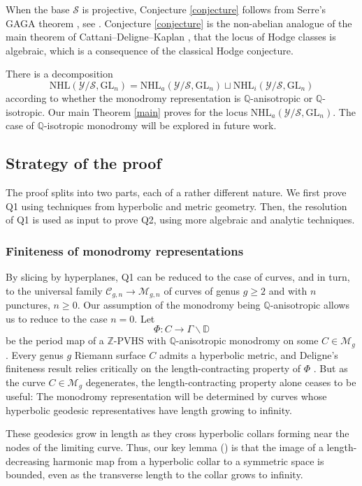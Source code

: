 \documentclass[10pt,letterpaper,english,reqno]{amsart}
\numberwithin{equation}{subsection}
\newcommand\cC{{\mathcal C}}
\newcommand\cM{{\mathcal M}}
\newcommand\cS{{\mathcal S}}
\newcommand\cY{{\mathcal Y}}
\newcommand\bD{{\mathbb D}}
\newcommand\Q{{\mathbb Q}}
\newcommand\Z{{\mathbb Z}}
\theoremstyle{definition}
\begin{document}
When the base $\cS$ is projective, Conjecture \ref{conjecture}
follows from Serre's GAGA theorem \cite{gaga}, see
\cite[Corollary 12.2]{simpson}.
Conjecture \ref{conjecture}
is the non-abelian analogue
of the main theorem of 
Cattani--Deligne--Kaplan \cite{CDK},
that the locus of Hodge
classes is algebraic, which is a 
consequence of the classical Hodge
conjecture.

There is a decomposition
$$ \mathrm{NHL}(\cY/\cS,\mathrm{GL}_n) =
\mathrm{NHL}_a(\cY/\cS,\mathrm{GL}_n)\sqcup \mathrm{NHL}_{i}(\cY/\cS,\mathrm{GL}_n)$$ according to whether the monodromy representation
is $\Q$-anisotropic or $\Q$-isotropic. Our main 
Theorem \ref{main} proves  for the locus $\mathrm{NHL}_a(\cY/\cS,\mathrm{GL}_n)$. The case of
$\Q$-isotropic monodromy will be explored in future work.

\subsection{Strategy of the proof}
The proof splits into two parts, each of a rather different nature. We first prove Q1 using techniques from hyperbolic and metric geometry.
Then, the resolution of Q1 is used as input to prove Q2, using more algebraic and analytic techniques.

\subsubsection{Finiteness of monodromy representations}
By slicing by hyperplanes, Q1 can be reduced to the case of curves,
and in turn, to the universal family $\cC_{g,n}\to \cM_{g,n}$ of curves of genus $g\geq 2$ and with $n$ punctures, $n\geq 0$. Our assumption of the monodromy being $\Q$-anisotropic allows us to reduce to the case $n=0$. Let $$\Phi\colon C\to \Gamma\backslash \bD$$
be the period map of a $\Z$-PVHS with $\Q$-anisotropic monodromy on some $C\in \cM_g$.
Every genus $g$ Riemann surface $C$ admits a hyperbolic metric, and
Deligne's finiteness result relies critically
on the length-contracting property of $\Phi$
\cite[10.1]{griffithsIII}. But as
the curve $C\in \cM_g$ degenerates, the length-contracting property
alone ceases to be useful: The monodromy representation
will be determined by curves whose hyperbolic geodesic
representatives have length growing to infinity.

These geodesics grow in length as they cross hyperbolic collars
forming near the nodes of the limiting curve.
Thus, our key lemma () is that the image of a length-decreasing
harmonic map from a hyperbolic collar to a symmetric space is 
bounded, even as the transverse length to the collar grows to 
infinity.
\end{document}

